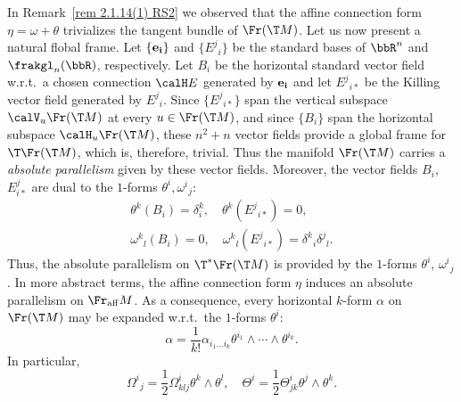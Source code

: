 \begin{rem}\label{rem 2.1.14(2) RS2}
    In Remark~\ref{rem 2.1.14(1) RS2} we observed that the affine connection form $\eta=\omega+\theta$ trivializes the tangent bundle of $\Fr(\T M)$. Let us now present a natural flobal frame. Let $\{\bf{e}_i\}$ and $\{E^j{}_i\}$ be the standard bases of $\bbR^n$ and $\frakgl_n(\bbR)$, respectively. Let $B_i$ be the horizontal standard vector field w.r.t.\ a chosen connection $\calH E$ generated by $\bf{e}_i$ and let $E^j{}_{i\ast}$ be the Killing vector field generated by $E^j{}_i$. Since $\{E^j{}_{i\ast}\}$ span the vertical subspace $\calV_u \Fr(\T M)$ at every $u\in\Fr(\T M)$, and since $\{B_i\}$ span the horizontal subspace $\calH_u \Fr(\T M)$, these $n^2+n$ vector fields provide a global frame for $\T\Fr(\T M)$, which is, therefore, trivial. Thus the manifold $\Fr(\T M)$ carries a \emph{absolute parallelism} given by these vector fields. Moreover, the vector fields $B_i$, $E^j_{i\ast}$ are dual to the $1$-forms $\theta^i,\omega^i{}_j$:
    \begin{gather}
        \theta^k(B_i)=\delta^k_i,\quad \theta^k(E^j{}_{i\ast})=0,\\
        \omega^k{}_l(B_i)=0,\quad \omega^k{}_l(E^j{}_{i\ast})=\delta^k{}_i\delta^j{}_l.
    \end{gather}
    Thus, the absolute parallelism on $\T^\ast\Fr(\T M)$ is provided by the $1$-forms $\theta^i$, $\omega^i{}_j$. In more abstract terms, the affine connection form $\eta$ induces an absolute parallelism on $\Fr_{\mathrm{aff}}M$. As a consequence, every horizontal $k$-form $\alpha$ on $\Fr(\T M)$ may be expanded w.r.t.\ the $1$-forms $\theta^i$:
    \[\alpha=\frac{1}{k!}\alpha_{i_1\ldots i_k}\theta^{i_1}\wedge \cdots\wedge \theta^{i_k}.\]
    In particular, 
    \[\Omega^i{}_j=\frac12 \Omega^i_{klj}\theta^k\wedge\theta^l,\quad \Theta^i=\frac12\Theta^i_{jk}\theta^j\wedge\theta^k.\label{eq 2.1.20 RS2}\]
\end{rem}

